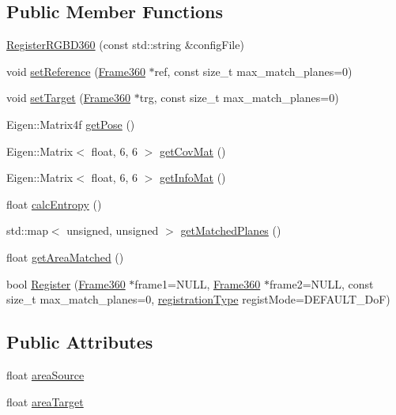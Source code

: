 \subsection*{Public Member Functions}
\begin{DoxyCompactItemize}
\item 
\hyperlink{classRegisterRGBD360_a0d2d0751710062d3d1a3cf4c9c642cdf}{Register\-R\-G\-B\-D360} (const std\-::string \&config\-File)
\item 
void \hyperlink{classRegisterRGBD360_af5b95ea47aa8787aac3a7a2adb853081}{set\-Reference} (\hyperlink{classFrame360}{Frame360} $\ast$ref, const size\-\_\-t max\-\_\-match\-\_\-planes=0)
\item 
void \hyperlink{classRegisterRGBD360_ab294206b1649007362fcb1cf58829f61}{set\-Target} (\hyperlink{classFrame360}{Frame360} $\ast$trg, const size\-\_\-t max\-\_\-match\-\_\-planes=0)
\item 
Eigen\-::\-Matrix4f \hyperlink{classRegisterRGBD360_a0841292296042084066ef9ca190da5e2}{get\-Pose} ()
\item 
Eigen\-::\-Matrix$<$ float, 6, 6 $>$ \hyperlink{classRegisterRGBD360_a2ad0276675ecdf745a864ceec44857c9}{get\-Cov\-Mat} ()
\item 
Eigen\-::\-Matrix$<$ float, 6, 6 $>$ \hyperlink{classRegisterRGBD360_a2d30249957556470e79524a981f32ebd}{get\-Info\-Mat} ()
\item 
float \hyperlink{classRegisterRGBD360_a1d38a8534a4648ae820c86c274f73c54}{calc\-Entropy} ()
\item 
std\-::map$<$ unsigned, unsigned $>$ \hyperlink{classRegisterRGBD360_af5e999e694818baf9b0ffc439ddd9869}{get\-Matched\-Planes} ()
\item 
float \hyperlink{classRegisterRGBD360_a960acb2d7cec9dcb5adfacf6cbefb5b3}{get\-Area\-Matched} ()
\item 
bool \hyperlink{classRegisterRGBD360_a68bf6709559cdcdc79fd328b37300f6d}{Register} (\hyperlink{classFrame360}{Frame360} $\ast$frame1=N\-U\-L\-L, \hyperlink{classFrame360}{Frame360} $\ast$frame2=N\-U\-L\-L, const size\-\_\-t max\-\_\-match\-\_\-planes=0, \hyperlink{classRegisterRGBD360_a919695c4544733673afeecdddd7f4937}{registration\-Type} regist\-Mode=D\-E\-F\-A\-U\-L\-T\-\_\-Do\-F)
\end{DoxyCompactItemize}
\subsection*{Public Attributes}
\begin{DoxyCompactItemize}
\item 
float \hyperlink{classRegisterRGBD360_a30f71035c229331a8b9eb3ee5b9855b0}{area\-Source}
\item 
float \hyperlink{classRegisterRGBD360_a8b6a2ee36d5a37d7ad6b8c612e66cb2a}{area\-Target}
\end{DoxyCompactItemize}
